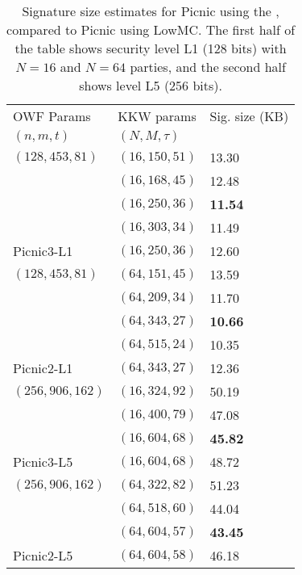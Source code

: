 \begin{table}
\begin{centering}
\begin{tabular}{l|l|l}
OWF Params      & KKW params        & Sig. size (KB)\\
$(n,m,t)$       & $(N, M, \tau)$    &   \\\hline
$(128,453,81)$  & $(16, 150, 51)$   & 13.30 \\
                & $(16, 168, 45)$   & 12.48 \\ 
                & $(16, 250, 36)$   & \textbf{11.54} \\
                & $(16, 303, 34)$   & 11.49 \\  
Picnic3-L1      & $(16, 250, 36)$   & 12.60 \\ \hline
$(128,453,81)$  & $(64, 151, 45)$   & 13.59 \\
                & $(64, 209, 34)$   & 11.70 \\ 
                & $(64, 343, 27)$   & \textbf{10.66} \\
                & $(64, 515, 24)$   & 10.35 \\ 
Picnic2-L1      & $(64, 343, 27)$   & 12.36 \\ \hline \hline
$(256,906,162)$ & $(16, 324, 92)$   & 50.19 \\ 
                & $(16, 400, 79)$   & 47.08 \\ 
                & $(16, 604, 68)$   & \textbf{45.82} \\ 
Picnic3-L5      & $(16, 604, 68)$   & 48.72 \\ \hline
$(256,906,162)$ & $(64, 322, 82)$   & 51.23 \\
                & $(64, 518, 60)$   & 44.04 \\ 
                & $(64, 604, 57)$   & \textbf{43.45} \\ 
Picnic2-L5      & $(64, 604, 58)$   & 46.18 \\ \hline
\end{tabular}
\caption{ \label{table:sig-sizes}Signature size estimates for Picnic using the
\ttOWF, compared to Picnic using LowMC.  The first half of the table shows
security level L1 (128 bits) with $N=16$ and $N=64$ parties, and the second
half shows level L5 (256 bits).}
\end{centering}
\end{table}



